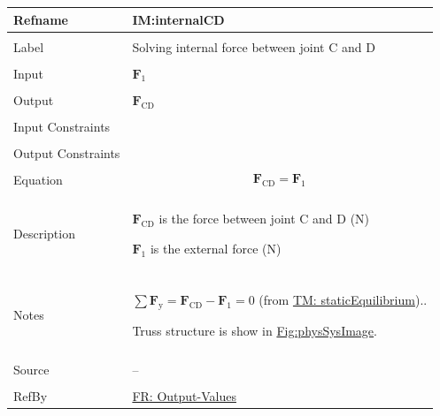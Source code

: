 \documentclass[12pt]{article}
\begin{document}
\begin{minipage}{\textwidth}
\begin{tabular}{>{\raggedright}p{}>{\raggedright\arraybackslash}p{}}
\toprule \textbf{Refname} & \textbf{IM:internalCD}
\label{IM:internalCD}
\\ \midrule \\
Label & Solving internal force between joint C and D
        
\\ \midrule \\
Input & ${\mathbf{F}_{1}}$
        
\\ \midrule \\
Output & ${\mathbf{F}_{\text{CD}}}$
         
\\ \midrule \\
Input Constraints & 
\\ \midrule \\
Output Constraints & 
\\ \midrule \\
Equation & \begin{displaymath}
           {\mathbf{F}_{\text{CD}}}={\mathbf{F}_{1}}
           \end{displaymath}
\\ \midrule \\
Description & \begin{symbDescription}
              \item{${\mathbf{F}_{\text{CD}}}$ is the force between joint C and D (${\text{N}}$)}
              \item{${\mathbf{F}_{1}}$ is the external force (${\text{N}}$)}
              \end{symbDescription}
\\ \midrule \\
Notes & $\displaystyle\sum{{\mathbf{F}_{\text{y}}}={\mathbf{F}_{\text{CD}}}-{\mathbf{F}_{1}}=0}$ (from \hyperref[TM:staticEquilibrium]{TM: staticEquilibrium})..
        
        Truss structure is show in \hyperref[Figure:physSysImage]{Fig:physSysImage}.
        
\\ \midrule \\
Source & --
         
\\ \midrule \\
RefBy & \hyperref[outputValues]{FR: Output-Values}
        
\\ \bottomrule
\end{tabular}
\end{minipage}
\end{document}
